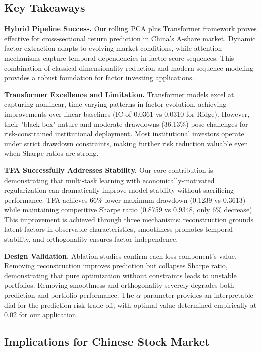 \documentclass[12pt]{article}
\begin{document}
\subsection{Key Takeaways}

\textbf{Hybrid Pipeline Success.} Our rolling PCA plus Transformer framework proves effective for cross-sectional return prediction in China's A-share market. Dynamic factor extraction adapts to evolving market conditions, while attention mechanisms capture temporal dependencies in factor score sequences. This combination of classical dimensionality reduction and modern sequence modeling provides a robust foundation for factor investing applications.

\textbf{Transformer Excellence and Limitation.} Transformer models excel at capturing nonlinear, time-varying patterns in factor evolution, achieving improvements over linear baselines (IC of 0.0361 vs 0.0310 for Ridge). However, their "black box" nature and moderate drawdowns (36.13\%) pose challenges for risk-constrained institutional deployment. Most institutional investors operate under strict drawdown constraints, making further risk reduction valuable even when Sharpe ratios are strong.

\textbf{TFA Successfully Addresses Stability.} Our core contribution is demonstrating that multi-task learning with economically-motivated regularization can dramatically improve model stability without sacrificing performance. TFA achieves 66\% lower maximum drawdown (0.1239 vs 0.3613) while maintaining competitive Sharpe ratio (0.8759 vs 0.9348, only 6\% decrease). This improvement is achieved through three mechanisms: reconstruction grounds latent factors in observable characteristics, smoothness promotes temporal stability, and orthogonality ensures factor independence.

\textbf{Design Validation.} Ablation studies confirm each loss component's value. Removing reconstruction improves prediction but collapses Sharpe ratio, demonstrating that pure optimization without constraints leads to unstable portfolios. Removing smoothness and orthogonality severely degrades both prediction and portfolio performance. The $\alpha$ parameter provides an interpretable dial for the prediction-risk trade-off, with optimal value determined empirically at 0.02 for our application.

\subsection{Implications for Chinese Stock Market}
\end{document}
